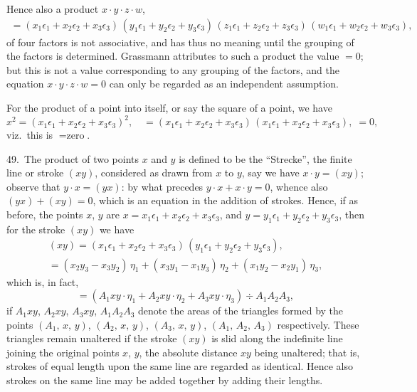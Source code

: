 \documentclass[12pt,a4paper]{article}
\theoremstyle{definition}
\begin{document}
Hence also a product $x \cdot y \cdot z \cdot w$,
\begin{multline*}
= (x_1 \epsilon_1 + x_2 \epsilon_2 + x_3 \epsilon_3)\,
(y_1 \epsilon_1 + y_2 \epsilon_2 + y_3 \epsilon_3)\,
(z_1 \epsilon_1 + z_2 \epsilon_2 + z_3 \epsilon_3)\,
(w_1 \epsilon_1 + w_2 \epsilon_2 + w_3 \epsilon_3),
\end{multline*}
of four factors is not associative, and has thus no meaning until the grouping of
the factors is determined. Grassmann attributes to such a product the value $= 0$;
but this is not a value corresponding to any grouping of the factors, and the equation
$x \cdot y \cdot z \cdot w = 0$ can only be regarded as an independent assumption.

For the product of a point into itself, or say the square of a point, we have
\[
x^2 = (x_1 \epsilon_1 + x_2 \epsilon_2 + x_3 \epsilon_3)^2, \quad
= (x_1 \epsilon_1 + x_2 \epsilon_2 + x_3 \epsilon_3)\,
(x_1 \epsilon_1 + x_2 \epsilon_2 + x_3 \epsilon_3), \;= 0,
\]
viz.\ this is $= \text{zero}$.

49.\ The product of two points $x$ and $y$ is defined to be the ``Strecke'', the finite
line or stroke $(xy)$, considered as drawn from $x$ to $y$, say we have $x \cdot y = (xy)$;
observe that $y \cdot x = (yx)$: by what precedes $y \cdot x + x \cdot y = 0$, whence
also $(yx) + (xy) = 0$, which is an equation in the addition of strokes.
Hence, if as before, the points $x$, $y$ are
$x = x_1 \epsilon_1 + x_2 \epsilon_2 + x_3 \epsilon_3$, and
$y = y_1 \epsilon_1 + y_2 \epsilon_2 + y_3 \epsilon_3$, then for the stroke $(xy)$ we have
\begin{multline*}
(xy) = (x_1 \epsilon_1 + x_2 \epsilon_2 + x_3 \epsilon_3)\, (y_1 \epsilon_1 + y_2 \epsilon_2 + y_3 \epsilon_3),\\
= (x_2 y_3 - x_3 y_2)\, \eta_1 + (x_3 y_1 - x_1 y_3)\, \eta_2 + (x_1 y_2 - x_2 y_1)\, \eta_3,
\end{multline*}
which is, in fact,
\[
= (A_1 xy \cdot \eta_1 + A_2 xy \cdot \eta_2 + A_3 xy \cdot \eta_3) \div A_1 A_2 A_3,
\]
if $A_1 xy$, $A_2 xy$, $A_3 xy$, $A_1 A_2 A_3$ denote the areas of the triangles formed by the points
$(A_1,\, x,\, y)$, $(A_2,\, x,\, y)$, $(A_3,\, x,\, y)$, $(A_1,\, A_2,\, A_3)$ respectively.
These triangles remain unaltered if the stroke $(xy)$ is slid along the indefinite line joining
the original points $x$, $y$, the absolute distance $xy$ being unaltered; that is, strokes of equal
length upon the same line are regarded as identical. Hence also strokes on the same line may
be added together by adding their lengths.
\end{document}
